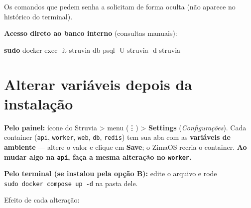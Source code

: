 \documentclass[
  10pt,
]{article}
\newenvironment{Shaded}{\begin{snugshade}}{\end{snugshade}}
\newcommand{\AttributeTok}[1]{\textcolor[rgb]{0.13,0.29,0.53}{#1}}
\newcommand{\FunctionTok}[1]{\textcolor[rgb]{0.13,0.29,0.53}{\textbf{#1}}}
\newcommand{\NormalTok}[1]{#1}
\begin{document}
Os comandos que pedem senha a solicitam de forma oculta (não aparece no
histórico do terminal).

\textbf{Acesso direto ao banco interno} (consultas manuais):

\begin{Shaded}
\begin{Highlighting}[]
\FunctionTok{sudo}\NormalTok{ docker exec }\AttributeTok{{-}it}\NormalTok{ struvia{-}db psql }\AttributeTok{{-}U}\NormalTok{ struvia }\AttributeTok{{-}d}\NormalTok{ struvia}
\end{Highlighting}
\end{Shaded}

\hypertarget{alterar-variuxe1veis-depois-da-instalauxe7uxe3o}{%
\section{Alterar variáveis depois da
instalação}\label{alterar-variuxe1veis-depois-da-instalauxe7uxe3o}}

\textbf{Pelo painel:} ícone do Struvia \textgreater{} menu (⋮)
\textgreater{} \textbf{Settings} (\emph{Configurações}). Cada container
(\texttt{api}, \texttt{worker}, \texttt{web}, \texttt{db},
\texttt{redis}) tem sua aba com as \textbf{variáveis de ambiente} ---
altere o valor e clique em \textbf{Save}; o ZimaOS recria o container.
\textbf{Ao mudar algo na \texttt{api}, faça a mesma alteração no
\texttt{worker}.}

\textbf{Pelo terminal (se instalou pela opção B):} edite o arquivo e
rode \texttt{sudo\ docker\ compose\ up\ -d} na pasta dele.

Efeito de cada alteração:
\end{document}
